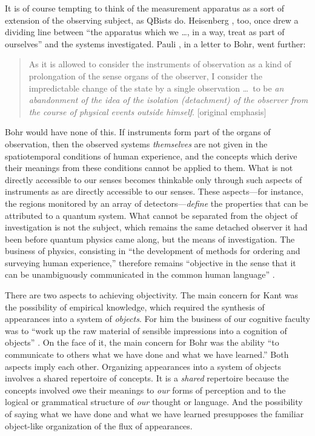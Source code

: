 \documentclass[12pt]{article}
\newcommand{\bq}{\begin{quote}}
\newcommand{\eq}{\end{quote}}
\begin{document}
It is of course tempting to think of the {measurement apparatus} as a sort of extension of the observing subject, as QBists do. Heisenberg \cite{Heisenberg1935}, too, once drew a dividing line between ``the apparatus which we \dots, in a way, treat as part of ourselves'' and the systems investigated. Pauli \cite{Pauli1955}, in a letter to Bohr, went further:
\bq
As it is allowed to consider the instruments of observation as a kind of prolongation of the sense organs of the {observer}, I consider the impredictable change of the state by a single observation \dots\ to be \emph{an abandonment of the idea of the isolation (detachment) of the observer from the course of physical events outside himself}. [original emphasis]
\eq
Bohr would have none of this. If instruments form part of the organs of observation, then the observed systems \emph{themselves} are not given in the spatiotemporal conditions of human experience, and the concepts which derive their meanings from these conditions cannot be applied to them. What is not directly accessible to our senses becomes thinkable only through such aspects of instruments as are directly accessible to our senses. These aspects---for instance, the regions monitored by an array of detectors---\emph{define} the properties that can be attributed to a quantum system. What cannot be separated from the object of investigation is not the subject, which remains the same detached observer it had been before quantum physics came along, but the means of investigation. The business of physics, consisting in ``the development of methods for ordering and surveying human {experience},'' therefore remains ``objective in the sense that it can be unambiguously communicated in the common human language'' \cite{BohrE58-62}.

There are two aspects to achieving objectivity. The main concern for Kant was the possibility of empirical knowledge, which required the synthesis of appearances into a system of \emph{objects}. For him the business of our cognitive faculty was to ``work up the raw material of sensible impressions into a cognition of objects'' \cite{KantCPR5}. On the face of it, the main concern for Bohr was the ability ``to communicate to others what we have done and what we have learned.'' Both aspects imply each other. Organizing appearances into a system of objects involves a shared repertoire of concepts. It is a \emph{shared} repertoire because the concepts involved owe their meanings to \emph{our} forms of perception and to the logical or grammatical structure of \emph{our} thought or language. And the possibility of saying what we have done and what we have learned presupposes the familiar object-like organization of the flux of appearances.
\end{document}
